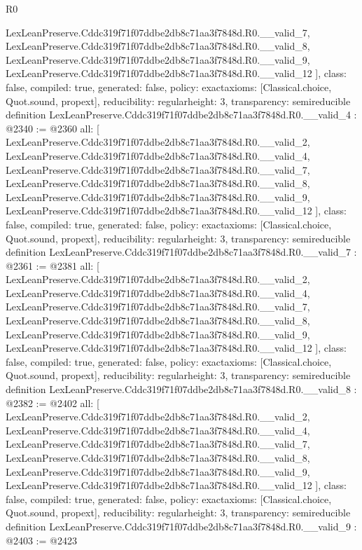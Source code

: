 \begin{lexlean}{R0}
\begin{coremodule}
{    LexLeanPreserve.Cddc319f71f07ddbe2db8c71aa3f7848d.R0.__valid_7,
    LexLeanPreserve.Cddc319f71f07ddbe2db8c71aa3f7848d.R0.__valid_8,
    LexLeanPreserve.Cddc319f71f07ddbe2db8c71aa3f7848d.R0.__valid_9,
    LexLeanPreserve.Cddc319f71f07ddbe2db8c71aa3f7848d.R0.__valid_12
  ],
  class: false,
  compiled: true,
  generated: false,
  policy: exact{axioms: [Classical.choice, Quot.sound, propext]},
  reducibility: regular{height: 3},
  transparency: semireducible
}
definition LexLeanPreserve.Cddc319f71f07ddbe2db8c71aa3f7848d.R0.__valid_4 : @2340 := @2360 {
  all: [
    LexLeanPreserve.Cddc319f71f07ddbe2db8c71aa3f7848d.R0.__valid_2,
    LexLeanPreserve.Cddc319f71f07ddbe2db8c71aa3f7848d.R0.__valid_4,
    LexLeanPreserve.Cddc319f71f07ddbe2db8c71aa3f7848d.R0.__valid_7,
    LexLeanPreserve.Cddc319f71f07ddbe2db8c71aa3f7848d.R0.__valid_8,
    LexLeanPreserve.Cddc319f71f07ddbe2db8c71aa3f7848d.R0.__valid_9,
    LexLeanPreserve.Cddc319f71f07ddbe2db8c71aa3f7848d.R0.__valid_12
  ],
  class: false,
  compiled: true,
  generated: false,
  policy: exact{axioms: [Classical.choice, Quot.sound, propext]},
  reducibility: regular{height: 3},
  transparency: semireducible
}
definition LexLeanPreserve.Cddc319f71f07ddbe2db8c71aa3f7848d.R0.__valid_7 : @2361 := @2381 {
  all: [
    LexLeanPreserve.Cddc319f71f07ddbe2db8c71aa3f7848d.R0.__valid_2,
    LexLeanPreserve.Cddc319f71f07ddbe2db8c71aa3f7848d.R0.__valid_4,
    LexLeanPreserve.Cddc319f71f07ddbe2db8c71aa3f7848d.R0.__valid_7,
    LexLeanPreserve.Cddc319f71f07ddbe2db8c71aa3f7848d.R0.__valid_8,
    LexLeanPreserve.Cddc319f71f07ddbe2db8c71aa3f7848d.R0.__valid_9,
    LexLeanPreserve.Cddc319f71f07ddbe2db8c71aa3f7848d.R0.__valid_12
  ],
  class: false,
  compiled: true,
  generated: false,
  policy: exact{axioms: [Classical.choice, Quot.sound, propext]},
  reducibility: regular{height: 3},
  transparency: semireducible
}
definition LexLeanPreserve.Cddc319f71f07ddbe2db8c71aa3f7848d.R0.__valid_8 : @2382 := @2402 {
  all: [
    LexLeanPreserve.Cddc319f71f07ddbe2db8c71aa3f7848d.R0.__valid_2,
    LexLeanPreserve.Cddc319f71f07ddbe2db8c71aa3f7848d.R0.__valid_4,
    LexLeanPreserve.Cddc319f71f07ddbe2db8c71aa3f7848d.R0.__valid_7,
    LexLeanPreserve.Cddc319f71f07ddbe2db8c71aa3f7848d.R0.__valid_8,
    LexLeanPreserve.Cddc319f71f07ddbe2db8c71aa3f7848d.R0.__valid_9,
    LexLeanPreserve.Cddc319f71f07ddbe2db8c71aa3f7848d.R0.__valid_12
  ],
  class: false,
  compiled: true,
  generated: false,
  policy: exact{axioms: [Classical.choice, Quot.sound, propext]},
  reducibility: regular{height: 3},
  transparency: semireducible
}
definition LexLeanPreserve.Cddc319f71f07ddbe2db8c71aa3f7848d.R0.__valid_9 : @2403 := @2423 {
}
\end{coremodule}
\end{lexlean}
